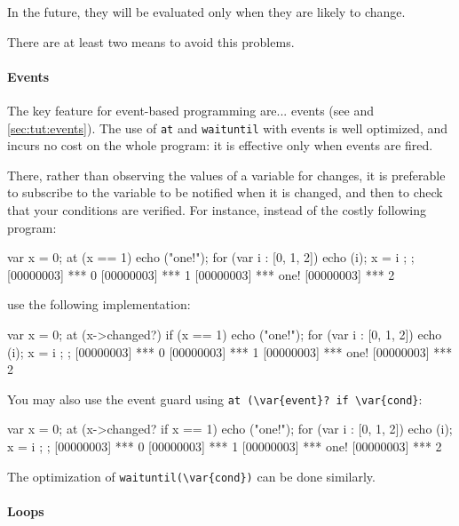 In the future, they will be evaluated only when they are likely to
change.

There are at least two means to avoid this problems.

\paragraph{Events}
The key \us feature for event-based programming are... events (see
 and \autoref{sec:tut:events}).  The use of
\lstinline|at| and \lstinline|waituntil| with events is well
optimized, and incurs no cost on the whole program: it is effective
only when events are fired.

There, rather than observing the values of a variable for changes, it
is preferable to subscribe to the variable to be notified when it is
changed, and then to check that your conditions are verified.  For
instance, instead of the costly following program:

\begin{urbiscript}[firstnumber=last]
{
  var x = 0;
  at (x == 1)
    echo ("one!");
  for (var i : [0, 1, 2])
  {
    echo (i);
    x = i
  };
};
[00000003] *** 0
[00000003] *** 1
[00000003] *** one!
[00000003] *** 2
\end{urbiscript}

\noindent
use the following implementation:

\begin{urbiscript}[firstnumber=last]
{
  var x = 0;
  at (x->changed?)
    if (x == 1)
      echo ("one!");
  for (var i : [0, 1, 2])
  {
    echo (i);
    x = i
  };
};
[00000003] *** 0
[00000003] *** 1
[00000003] *** one!
[00000003] *** 2
\end{urbiscript}

You may also use the event guard using %
\lstinline|at (\var{event}? if \var{cond}|:

\begin{urbiscript}[firstnumber=last]
{
  var x = 0;
  at (x->changed? if x == 1)
      echo ("one!");
  for (var i : [0, 1, 2])
  {
    echo (i);
    x = i
  };
};
[00000003] *** 0
[00000003] *** 1
[00000003] *** one!
[00000003] *** 2
\end{urbiscript}

The optimization of \lstinline|waituntil(\var{cond})| can be done
similarly.

\paragraph{Loops}

